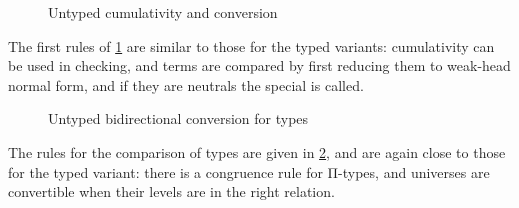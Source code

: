\begin{figure}[h]
  \ContinuedFloat*
  \caption{Untyped cumulativity and conversion}
  \label{fig:gene-ucum}
\end{figure}

\AP {}
The first rules of \cref{fig:gene-ucum} are similar to those for the typed variants: cumulativity can be used
in checking, and terms are compared by first reducing them to weak-head normal form, and if they are neutrals
the special  is called.

\begin{figure}[h]
  \ContinuedFloat
  \caption{Untyped bidirectional conversion for types}
  \label{fig:bd-cong-univ}
\end{figure}

\AP {}
The rules for the comparison of types are given in \cref{fig:bd-cong-univ}, and are again
close to those for the typed variant: there is a congruence rule for Π-types,
and universes are convertible when their levels are in the right relation.

